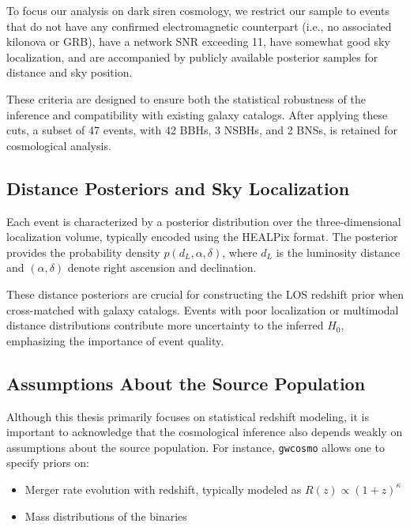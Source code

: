 To focus our analysis on dark siren cosmology, we restrict our sample to events that do not have any confirmed electromagnetic counterpart (i.e., no associated kilonova or GRB), have a network \ac{SNR} exceeding 11, have somewhat good sky localization, and are accompanied by publicly available posterior samples for distance and sky position.

These criteria are designed to ensure both the statistical robustness of the inference and compatibility with existing galaxy catalogs. After applying these cuts, a subset of 47 events, with 42 \acp{BBH}, 3
\acp{NSBH}, and 2 \acp{BNS}, is retained for cosmological analysis.

\subsection{Distance Posteriors and Sky Localization}

Each event is characterized by a posterior distribution over the three-dimensional localization volume, typically encoded using the HEALPix format. The posterior provides the probability density $p(d_L, \alpha, \delta)$, where $d_L$ is the luminosity distance and $(\alpha, \delta)$ denote right ascension and declination.

These distance posteriors are crucial for constructing the \ac{LOS} redshift prior when cross-matched with galaxy catalogs. Events with poor localization or multimodal distance distributions contribute more uncertainty to the inferred $H_0$, emphasizing the importance of event quality.

\subsection{Assumptions About the Source Population}
\label{sec:source_population}

Although this thesis primarily focuses on statistical redshift modeling, it is important to acknowledge that the cosmological inference also depends weakly on assumptions about the source population. For instance, \texttt{gwcosmo} allows one to specify priors on:
\begin{itemize}
  \item Merger rate evolution with redshift, typically modeled as \( R(z) \propto (1+z)^\kappa \)
  \vspace{-1em}
  \item Mass distributions of the binaries
\end{itemize}

